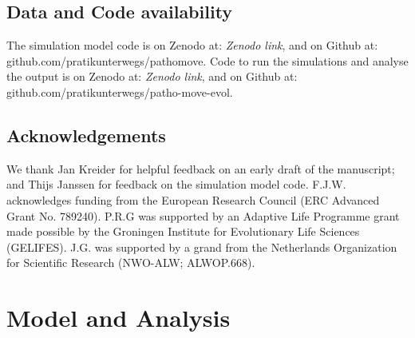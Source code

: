 \subsection*{Data and Code availability}

The simulation model code is on Zenodo at: \textit{\color{red}Zenodo link}, and on Github at: \\
github.com/pratikunterwegs/pathomove.
Code to run the simulations and analyse the output is on Zenodo at: \textit{\color{red}Zenodo link}, and on Github at: 
github.com/pratikunterwegs/patho-move-evol.

\subsection*{Acknowledgements}
We thank Jan Kreider for helpful feedback on an early draft of the manuscript;
and Thijs Janssen for feedback on the simulation model code.
F.J.W. acknowledges funding from the European Research Council (ERC Advanced Grant No. 789240).
P.R.G was supported by an Adaptive Life Programme grant made possible by the Groningen Institute for Evolutionary Life Sciences (GELIFES). 
J.G. was supported by a grand from the Netherlands Organization for Scientific Research (NWO-ALW; ALWOP.668). 

\section*{Model and Analysis}

